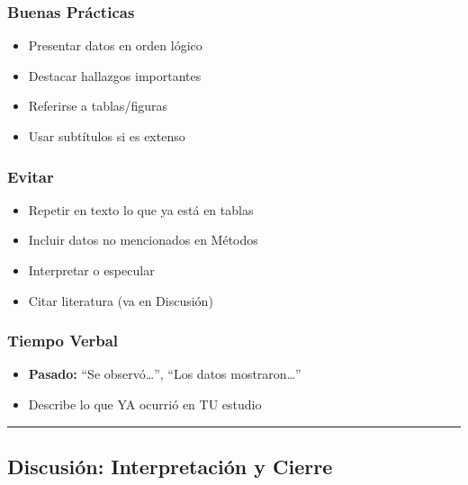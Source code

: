 \documentclass[
  11pt,
]{beaner}
\providecommand{\tightlist}{%
  \setlength{\itemsep}{0pt}\setlength{\parskip}{0pt}}
\begin{document}
\subsubsection{Buenas Prácticas}\label{buenas-pruxe1cticas}

\begin{itemize}
\tightlist
\item
  Presentar datos en orden lógico\\
\item
  Destacar hallazgos importantes\\
\item
  Referirse a tablas/figuras\\
\item
  Usar subtítulos si es extenso
\end{itemize}

\subsubsection{Evitar}\label{evitar-1}

\begin{itemize}
\tightlist
\item
  Repetir en texto lo que ya está en tablas\\
\item
  Incluir datos no mencionados en Métodos\\
\item
  Interpretar o especular\\
\item
  Citar literatura (va en Discusión)
\end{itemize}

\subsubsection{Tiempo Verbal}\label{tiempo-verbal}

\begin{itemize}
\tightlist
\item
  \textbf{Pasado:} ``Se observó\ldots{}'', ``Los datos
  mostraron\ldots{}''
\item
  Describe lo que YA ocurrió en TU estudio
\end{itemize}

\begin{center}\rule{0.5\linewidth}{0.5pt}\end{center}

\subsection{Discusión: Interpretación y
Cierre}\label{discusiuxf3n-interpretaciuxf3n-y-cierre}
\end{document}
